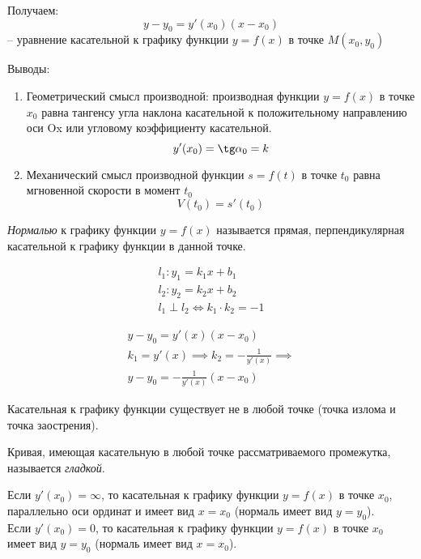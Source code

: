 Получаем: \[
  \boxed{y - y_0 = y'(x_0)(x - x_0)}
\] 
-- уравнение касательной к графику функции $y = f(x)$ в точке $M(x_0, y_0)$

Выводы:
\begin{enumerate}
  \item Геометрический смысл производной: производная функции $y = f(x)$ в точке  $x_0$ равна тангенсу угла наклона касательной к положительному направлению оси Ox или угловому коэффициенту касательной. \[
    y'(x_0) = \tg \alpha_0 = k
  \] 
  \item Механический смысл производной функции $s = f(t)$ в точке $t_0$ равна мгновенной скорости в момент $t_0$ \[
      V(t_0) = s'(t_0) 
    \]
\end{enumerate}

\begin{definition}
  \textit{Нормалью} к графику функции $y=f(x)$ называется прямая, перпендикулярная касательной к графику функции в данной точке.
\end{definition}

\begin{gather*}
  l_1: y_1 = k_1x + b_1 \\
  l_2: y_2 = k_2x + b_2 \\
  l_1 \perp l_2 \iff k_1 \cdot k_2 = -1
\end{gather*}

\begin{gather*}
    y - y_0 = y'(x)(x - x_0) \\
    k_1 = y'(x) \implies k_2 = -\frac{1}{y'(x)} \implies \\
    \boxed{
      y - y_0 = -\frac{1}{y'(x)}(x - x_0)
    }
\end{gather*}

\begin{note}
  Касательная к графику функции существует не в любой точке (точка излома и точка заострения).
\end{note}

\begin{definition}
  Кривая, имеющая касательную в любой точке рассматриваемого промежутка, называется \textit{гладкой}.
\end{definition}

\begin{corollary}
  Если $y'(x_0) = \infty$, то касательная к графику функции $y=f(x)$ в точке $x_0$, параллельно оси ординат и имеет вид $x = x_0$ (нормаль имеет вид $y = y_0$). \\
  Если $y'(x_0) = 0$, то касательная к графику функции $y = f(x)$ в точке  $x_0$ имеет вид $y = y_0$ (нормаль имеет вид $x = x_0$).
\end{corollary}

